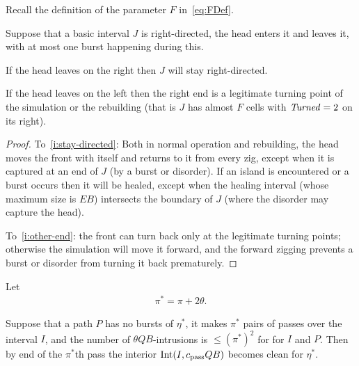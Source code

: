 \documentclass[11pt]{memoir}
\theoremstyle{definition} %
\renewcommand{\le}{\leq}
\newcommand{\fld}[1]{\ensuremath{\textit{#1\/}}}
\def\B{B}
\newcommand{\E}{E}
\newcommand{\F}{F}
\newcommand{\Int}{\mathrm{Int}}
\newcommand{\passno}{\pi}
\newcommand{\Q}{Q}
\newcommand{\Turned}{\fld{Turned}}
\newcommand{\cns}[1]{c_{\textrm{\upshape #1}}}
\newcommand{\CPass}{\cns{pass}}
\begin{document}
Recall the definition of the parameter \( \F \) in~\eqref{eq:FDef}.

  \begin{lemma}\label{lem:keep-directed}
    Suppose that a basic interval \( J \) is right-directed, the head enters it and leaves it,
    with at most one burst happening during this.
  \begin{alphenum}
  \item\label{i:stay-directed}  If the head leaves on the right then
    \( J \) will stay right-directed. 
  \item\label{i:other-end}  If the head leaves on the left then the right end
    is a legitimate turning point of the simulation or the rebuilding
    (that is \( J \) has almost \( \F \) cells with \( \Turned=2 \) on its right).
  \end{alphenum}
\end{lemma}
\begin{proof}
  To~\eqref{i:stay-directed}: Both in normal operation and rebuilding,
  the head moves the front with itself and returns to it from every zig, except when it is
  captured at an end of \( J \) (by a burst or disorder).
  If an island is encountered or a burst occurs then it will be healed, except when the healing interval
  (whose maximum size is \( \E\B \)) intersects
  the boundary of \( J \) (where the disorder may capture the head).

  To~\eqref{i:other-end}: the front can turn back only at the legitimate turning points;
  otherwise the simulation will move it forward, and the forward zigging prevents a burst or
  disorder from turning it back prematurely.
\end{proof}

Let
\begin{align}\label{eq:pi-star}
 \passno^{*}= \passno +2\theta.
\end{align}

\begin{lemma}\label{lem:pass-clean}
Suppose that a path \( P \) has no bursts of \( \eta^{*} \), it makes \( \passno^{*} \) pairs of passes over
the interval \( I \),
and the number of \( \theta \Q\B \)-intrusions is \( \le (\passno^{*})^{2} \) for
for \( I \) and \( P \).
Then by end of the \( \passno ^{*} \)th pass the interior
\( \Int(I, \CPass\Q\B) \) becomes clean for \( \eta^{*} \).
\end{lemma}
\end{document}
